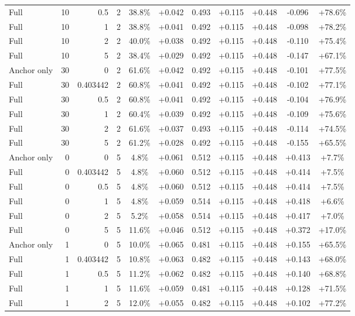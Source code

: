 \begin{table}[htbp]
\begin{tabular}{lrrrccccccc}
Full & 10 & 0.5 & 2 & 38.8\% & +0.042 & 0.493 & +0.115 & +0.448 & -0.096 & +78.6\% \\
Full & 10 & 1 & 2 & 38.8\% & +0.041 & 0.492 & +0.115 & +0.448 & -0.098 & +78.2\% \\
Full & 10 & 2 & 2 & 40.0\% & +0.038 & 0.492 & +0.115 & +0.448 & -0.110 & +75.4\% \\
Full & 10 & 5 & 2 & 38.4\% & +0.029 & 0.492 & +0.115 & +0.448 & -0.147 & +67.1\% \\
Anchor only & 30 & 0 & 2 & 61.6\% & +0.042 & 0.492 & +0.115 & +0.448 & -0.101 & +77.5\% \\
Full & 30 & 0.403442 & 2 & 60.8\% & +0.041 & 0.492 & +0.115 & +0.448 & -0.102 & +77.1\% \\
Full & 30 & 0.5 & 2 & 60.8\% & +0.041 & 0.492 & +0.115 & +0.448 & -0.104 & +76.9\% \\
Full & 30 & 1 & 2 & 60.4\% & +0.039 & 0.492 & +0.115 & +0.448 & -0.109 & +75.6\% \\
Full & 30 & 2 & 2 & 61.6\% & +0.037 & 0.493 & +0.115 & +0.448 & -0.114 & +74.5\% \\
Full & 30 & 5 & 2 & 61.2\% & +0.028 & 0.492 & +0.115 & +0.448 & -0.155 & +65.5\% \\
Anchor only & 0 & 0 & 5 & 4.8\% & +0.061 & 0.512 & +0.115 & +0.448 & +0.413 & +7.7\% \\
Full & 0 & 0.403442 & 5 & 4.8\% & +0.060 & 0.512 & +0.115 & +0.448 & +0.414 & +7.5\% \\
Full & 0 & 0.5 & 5 & 4.8\% & +0.060 & 0.512 & +0.115 & +0.448 & +0.414 & +7.5\% \\
Full & 0 & 1 & 5 & 4.8\% & +0.059 & 0.514 & +0.115 & +0.448 & +0.418 & +6.6\% \\
Full & 0 & 2 & 5 & 5.2\% & +0.058 & 0.514 & +0.115 & +0.448 & +0.417 & +7.0\% \\
Full & 0 & 5 & 5 & 11.6\% & +0.046 & 0.512 & +0.115 & +0.448 & +0.372 & +17.0\% \\
Anchor only & 1 & 0 & 5 & 10.0\% & +0.065 & 0.481 & +0.115 & +0.448 & +0.155 & +65.5\% \\
Full & 1 & 0.403442 & 5 & 10.8\% & +0.063 & 0.482 & +0.115 & +0.448 & +0.143 & +68.0\% \\
Full & 1 & 0.5 & 5 & 11.2\% & +0.062 & 0.482 & +0.115 & +0.448 & +0.140 & +68.8\% \\
Full & 1 & 1 & 5 & 11.6\% & +0.059 & 0.481 & +0.115 & +0.448 & +0.128 & +71.5\% \\
Full & 1 & 2 & 5 & 12.0\% & +0.055 & 0.482 & +0.115 & +0.448 & +0.102 & +77.2\% \\

\end{tabular}
\end{table}

